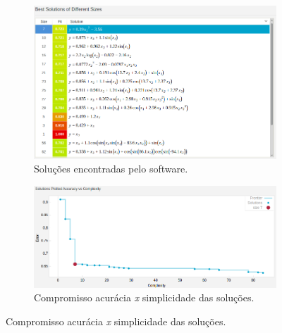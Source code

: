	\begin{figure}[h!]
	
	\centering
	
		\begin{subfigure}{.45\textwidth} 
		  \centering
		  \includegraphics[width=1\linewidth]{aproximacao/solucoes_map2_r}
		  \caption{\centering Soluções encontradas pelo software.} 
		  \label{fig:map2_solucoes_c_ruido} 
		\end{subfigure}%
		\begin{subfigure}{.55\textwidth}
		  \centering
		  \includegraphics[width=1\linewidth]{aproximacao/pareto_map2_r}
		  \caption{\centering Compromisso acurácia \textit{x} simplicidade das
		  soluções.}
		  \label{fig:map2_pareto_c_ruido} 
		\end{subfigure}
	

\end{figure}
